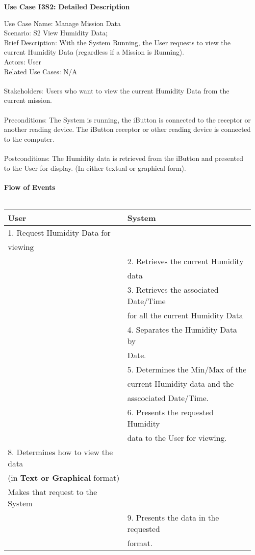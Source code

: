 \documentclass[letterpaper]{article}
\begin{document}
\noindent
\begin{center}
\textbf{Use Case I3S2:  Detailed Description}
\end{center}
Use Case Name:  Manage Mission Data\\
Scenario: S2 View Humidity Data;\\
Brief Description:  With the System Running, the User requests to view
the current Humidity Data (regardless if a Mission is Running).\\
Actors:  User\\
Related Use Cases:  N/A\\\\
Stakeholders:  Users who want to view the current Humidity Data from
the current mission.\\\\
Preconditions:  The System is running, the iButton is connected to the
receptor or another reading device.  The iButton receptor or other
reading device is connected to the computer.\\\\
Postconditions:  The Humidity data is retrieved from the iButton and
presented to the User for display.  (In either textual or graphical
form).\\\\
\textbf{Flow of Events}\\\\
\begin{tabular}{|l|l|}\hline
\textbf{User} & \textbf{System}\\\hline
1.  Request Humidity Data for &\\
viewing & \\\hline
& 2.  Retrieves the current Humidity\\
& data\\\hline
& 3.  Retrieves the associated Date/Time \\
& for all the current Humidity Data\\\hline
& 4.  Separates the Humidity Data by\\
& Date.\\\hline
& 5.  Determines the Min/Max of the\\
& current  Humidity data and the\\
&  asscociated  Date/Time.\\\hline
& 6.  Presents the requested Humidity\\
& data to the User for viewing.\\\hline
8.  Determines how to view the data &\\
(in \textbf{Text or Graphical} format) &\\
Makes that request to the System & \\\hline
& 9.  Presents the data in the requested\\
& format.\\\hline
\end{tabular}\\\\
\end{document}
